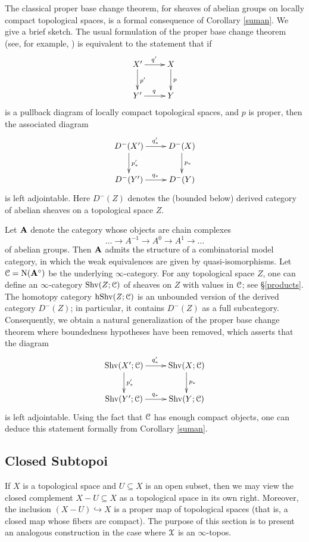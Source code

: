 \begin{remark}\label{classicpbct}
The classical proper base change theorem, for sheaves of abelian groups on locally compact
topological spaces, is a formal consequence of Corollary \ref{suman}. We give a brief sketch.
The usual formulation of the proper base change theorem (see, for example, \cite{kashiwara}) is equivalent to the statement that
if
$$ \xymatrix{ X' \ar[r]^{q'} \ar[d]^{p'} & X \ar[d]^{p} \\
Y' \ar[r]^{q} & Y }$$
is a pullback diagram of locally compact topological spaces, and $p$ is proper, then
the associated diagram
$$ \xymatrix{ D^{-}(X') \ar[r]^{q'_{\ast}} \ar[d]^{p'_{\ast}} & D^{-}(X) \ar[d]^{p_{\ast}} \\
D^{-}(Y') \ar[r]^{q_{\ast}} & D^{-}(Y) }$$
is left adjointable. Here $D^{-}(Z)$ denotes the (bounded below) derived category
of abelian sheaves on a topological space $Z$. 

Let ${\mathbf A}$ denote the category whose objects are chain complexes
$$ \ldots \rightarrow A^{-1} \rightarrow A^0 \rightarrow A^1 \rightarrow \ldots $$
of abelian groups. Then ${\mathbf A}$ admits the structure of a combinatorial model category, in which the weak equivalences are given by quasi-isomorphisms. Let $\operatorname{\mathcal{C}} = \operatorname{N}( {\mathbf A}^{\circ})$ be the underlying $\infty$-category.
For any topological space $Z$, one can define an $\infty$-category
$\operatorname{Shv}(Z;\operatorname{\mathcal{C}})$ of sheaves on $Z$ with values in $\operatorname{\mathcal{C}}$; see \S \ref{products}. The homotopy
category $\rm{h} \it{\operatorname{Shv}(Z;\operatorname{\mathcal{C}})}$ is an unbounded version of the derived category
$D^{-}(Z)$; in particular, it contains $D^{-}(Z)$ as a full subcategory. Consequently, we obtain a natural generalization of the proper base change theorem where boundedness hypotheses have been removed, which asserts that the diagram
$$ \xymatrix{ \Shv(X'; \calC) \ar[r]^{q'_{\ast}} \ar[d]^{p'_{\ast}} & \Shv(X;\calC) \ar[d]^{p_{\ast}} \\
\Shv(Y'; \calC) \ar[r]^{q_{\ast}} & \Shv(Y;\calC) }$$
is left adjointable. Using the fact that $\operatorname{\mathcal{C}}$ has enough compact objects, one can deduce this statement formally from Corollary \ref{suman}.
\end{remark}

\subsection{Closed Subtopoi}\label{closedsub}

If $X$ is a topological space and $U \subseteq X$ is an open subset, then we may view
the closed complement $X-U \subseteq X$ as a topological space in its own right. Moreover, the inclusion $(X-U) \hookrightarrow X$ is a proper map of topological spaces (that is, a closed map whose fibers are compact). The purpose of this section is to present an analogous construction in the case where $\operatorname{\mathcal{X}}$ is an $\infty$-topos.

